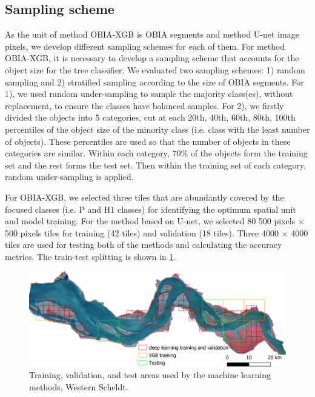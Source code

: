 \documentclass{isprs} %
\begin{document}
\subsection{Sampling scheme}
\label{cv}

As the unit of method OBIA-XGB is OBIA segments and method U-net image pixels, we develop different sampling schemes for each of them. For method OBIA-XGB, it is necessary to develop a sampling scheme that accounts for the object size for the tree classifier. We evaluated two sampling schemes: 1) random sampling and 2) stratified sampling according to the size of OBIA segments. For 1), we used random under-sampling to sample the majority class(es), without replacement, to ensure the classes have balanced samples. For 2), we firstly divided the objects into 5 categories, cut at each 20th, 40th, 60th, 80th, 100th percentiles of the object size of the minority class (i.e. class with the least number of objects). These percentiles are used so that the number of objects in these categories are similar. Within each category, 70\% of the objects form the training set and the rest forms the test set. Then within the training set of each category, random under-sampling is applied. 

For OBIA-XGB, we selected three tiles that are abundantly covered by the focused classes (i.e. P and H1 classes) for identifying the optimum spatial unit and model training. For the method based on U-net, we selected 80 500 pixels $\times$ 500 pixels tiles for training (42 tiles) and validation (18 tiles). Three 4000 $\times$ 4000 tiles are used for testing both of the methods and calculating the accuracy metrics. The train-test splitting is shown in \cref{fig:tt}. 

\begin{figure}
    \centering
    \includegraphics[scale = 0.3]{figures/train_test_tileOverview.png}
    \caption{Training, validation, and test areas used by the machine learning methods, Western Scheldt.}
    \label{fig:tt}
\end{figure}
\end{document}
